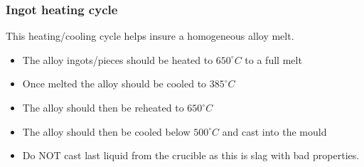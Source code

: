 \subsubsection{Ingot heating cycle}

This heating/cooling cycle helps insure a homogeneous alloy melt.
\begin{itemize}
\item The \MgZnCa  alloy ingots/pieces should be heated to $650^{\circ}C$ to a full melt
\item Once melted the alloy should be cooled to $385^{\circ}C$
\item The alloy should then be reheated to $650^{\circ}C$
\item The alloy should then be cooled below $500^{\circ}C$ and cast into the mould
\item Do NOT cast last liquid from the crucible as this is slag with bad properties. 
\end{itemize}